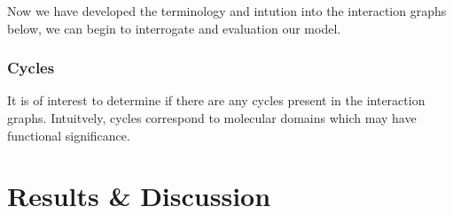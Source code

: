 \documentclass[phd,tocprelim]{cornell}
\begin{document}
Now we have developed the terminology and intution into the interaction
graphs below, we can begin to interrogate and evaluation our model.

\subsection{Cycles}

It is of interest to determine if there are any cycles present in the
interaction graphs.  Intuitvely, cycles correspond to molecular domains which
may have functional significance.


\chapter{Results & Discussion}




\end{document}
